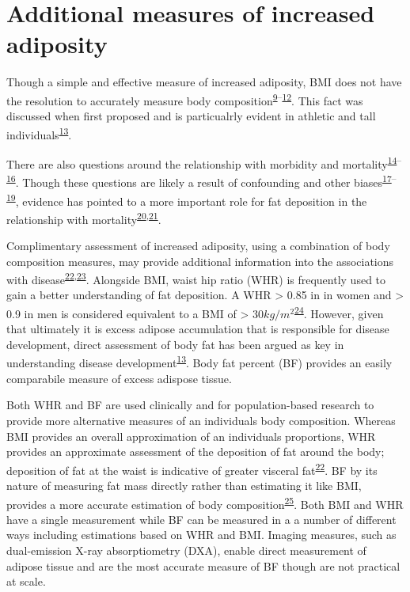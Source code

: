 \documentclass[11pt,twoside]{bristolthesis}
\begin{document}
\hypertarget{additional-measures}{%
\section{Additional measures of increased adiposity}\label{additional-measures}}

Though a simple and effective measure of increased adiposity, BMI does not have the resolution to accurately measure body composition\textsuperscript{\protect\hyperlink{ref-Pischon2008}{9}--\protect\hyperlink{ref-Pasco2012}{12}}. This fact was discussed when first proposed and is particualrly evident in athletic and tall individuals\textsuperscript{\protect\hyperlink{ref-Prentice2001}{13}}.

There are also questions around the relationship with morbidity and mortality\textsuperscript{\protect\hyperlink{ref-Flegal2013}{14}--\protect\hyperlink{ref-Elagizi2018}{16}}. Though these questions are likely a result of confounding and other biases\textsuperscript{\protect\hyperlink{ref-Banack2013}{17}--\protect\hyperlink{ref-Khan2018}{19}}, evidence has pointed to a more important role for fat deposition in the relationship with mortality\textsuperscript{\protect\hyperlink{ref-Sahakyan2015}{20},\protect\hyperlink{ref-Hamer2017}{21}}.

Complimentary assessment of increased adiposity, using a combination of body composition measures, may provide additional information into the associations with disease\textsuperscript{\protect\hyperlink{ref-WorldHealthOrganisation2008}{22},\protect\hyperlink{ref-Collaboration2009}{23}}. Alongside BMI, waist hip ratio (WHR) is frequently used to gain a better understanding of fat deposition. A WHR \textgreater{} 0.85 in in women and \textgreater{} 0.9 in men is considered equivalent to a BMI of \textgreater{} 30\(kg/m^2\)\textsuperscript{\protect\hyperlink{ref-WHO2008}{24}}. However, given that ultimately it is excess adipose accumulation that is responsible for disease development, direct assessment of body fat has been argued as key in understanding disease development\textsuperscript{\protect\hyperlink{ref-Prentice2001}{13}}. Body fat percent (BF) provides an easily comparabile measure of excess adispose tissue.

Both WHR and BF are used clinically and for population-based research to provide more alternative measures of an individuals body composition. Whereas BMI provides an overall approximation of an individuals proportions, WHR provides an approximate assessment of the deposition of fat around the body; deposition of fat at the waist is indicative of greater visceral fat\textsuperscript{\protect\hyperlink{ref-WorldHealthOrganisation2008}{22}}. BF by its nature of measuring fat mass directly rather than estimating it like BMI, provides a more accurate estimation of body composition\textsuperscript{\protect\hyperlink{ref-WorldHealthOrganisation2000}{25}}. Both BMI and WHR have a single measurement while BF can be measured in a a number of different ways including estimations based on WHR and BMI. Imaging measures, such as dual-emission X-ray absorptiometry (DXA), enable direct measurement of adipose tissue and are the most accurate measure of BF though are not practical at scale.
\end{document}
